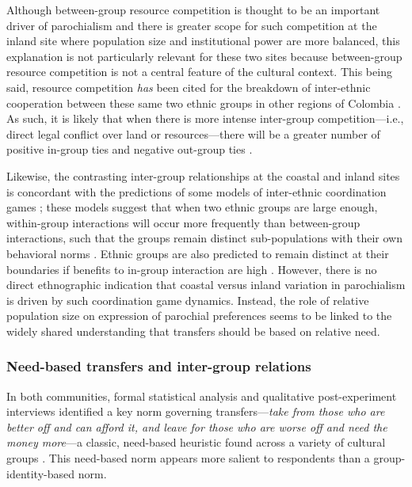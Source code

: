 \documentclass[bibauthoryear]{aa}
\begin{document}
Although between-group resource competition is thought to be an important driver of parochialism  \citep{bellmoya} and there is greater scope for such competition at the inland site where population size and institutional power are more balanced, this explanation is not particularly relevant for these two sites because between-group resource competition is not a central feature of the cultural context. This being said, resource competition \textit{has} been cited for the breakdown of inter-ethnic cooperation between these same two ethnic groups in other regions of Colombia \citep[e.g.,][]{ng2000titling, davis2002indigenous, garcia2009diversos, velasco2011contested}. As such, it is likely that when there is more intense inter-group competition---i.e.,  direct legal conflict over land or resources---there will be a greater number of positive in-group ties and negative out-group ties \citet{choi2007coevolution}.

Likewise, the contrasting inter-group relationships at the coastal and inland sites is concordant with the predictions of some models of inter-ethnic coordination games \citep[e.g.,][]{mcelreath2003shared, advani2015melting}; these models suggest that when two ethnic groups are large enough, within-group interactions will occur more frequently than between-group interactions, such that the groups remain distinct sub-populations with their own behavioral norms \citep{bunce2017interethnic, bunce2018sustainability}. Ethnic groups are also predicted to remain distinct at their boundaries if benefits to in-group interaction are high \citep{mcelreath2003shared}. 
However, there is no direct ethnographic indication that coastal versus inland variation in parochialism is driven by such coordination game dynamics. Instead, the role of relative population size on expression of parochial preferences seems to be linked to the widely shared understanding that transfers should be based on relative need.




\subsubsection{Need-based transfers and inter-group relations}\label{discneed}

In both communities, formal statistical analysis and qualitative post-experiment interviews identified a key norm governing transfers---\textit{take from those who are better off and can afford it, and leave for those who are worse off and need the money more}---a classic, need-based heuristic found across a variety of cultural groups
\citep[e.g., ][]{peterson1993demand, hooper2015inclusive, aktipis2016cooperation, hao2015need, gervais2017rich, cronk2019managing}. This need-based norm appears more salient to respondents than a group-identity-based norm.
\end{document}
